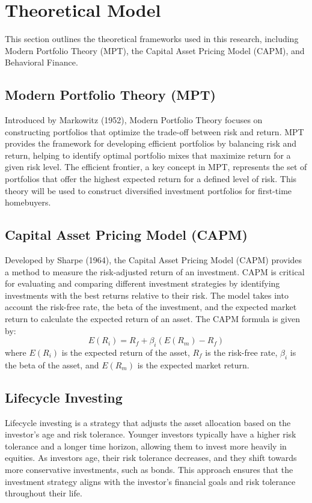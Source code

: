 \section{Theoretical Model}

This section outlines the theoretical frameworks used in this research, including Modern Portfolio Theory (MPT), the Capital Asset Pricing Model (CAPM), and Behavioral Finance.

\subsection{Modern Portfolio Theory (MPT)}
Introduced by Markowitz (1952), Modern Portfolio Theory focuses on constructing portfolios that optimize the trade-off between risk and return. MPT provides the framework for developing efficient portfolios by balancing risk and return, helping to identify optimal portfolio mixes that maximize return for a given risk level. The efficient frontier, a key concept in MPT, represents the set of portfolios that offer the highest expected return for a defined level of risk. This theory will be used to construct diversified investment portfolios for first-time homebuyers.

\subsection{Capital Asset Pricing Model (CAPM)}
Developed by Sharpe (1964), the Capital Asset Pricing Model (CAPM) provides a method to measure the risk-adjusted return of an investment. CAPM is critical for evaluating and comparing different investment strategies by identifying investments with the best returns relative to their risk. The model takes into account the risk-free rate, the beta of the investment, and the expected market return to calculate the expected return of an asset. The CAPM formula is given by:
\[ E(R_i) = R_f + \beta_i (E(R_m) - R_f) \]
where \(E(R_i)\) is the expected return of the asset, \(R_f\) is the risk-free rate, \(\beta_i\) is the beta of the asset, and \(E(R_m)\) is the expected market return.

\subsection{Lifecycle Investing}
Lifecycle investing is a strategy that adjusts the asset allocation based on the investor's age and risk tolerance. Younger investors typically have a higher risk tolerance and a longer time horizon, allowing them to invest more heavily in equities. As investors age, their risk tolerance decreases, and they shift towards more conservative investments, such as bonds. This approach ensures that the investment strategy aligns with the investor's financial goals and risk tolerance throughout their life.

